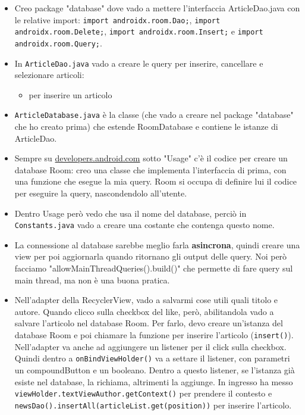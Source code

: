 \begin{itemize}
    \item Creo package "database" dove vado a mettere l'interfaccia ArticleDao.java con le relative import: \texttt{import androidx.room.Dao;}, \texttt{import androidx.room.Delete;}, \texttt{import androidx.room.Insert;} e \texttt{import androidx.room.Query;}.
    \item In \texttt{ArticleDao.java} vado a creare le query per inserire, cancellare e selezionare articoli:
    \begin{itemize}
        \item \texttt{\@Insert} per inserire un articolo
    \end{itemize}
    \item \texttt{ArticleDatabase.java} è la classe (che vado a creare nel package "database" che ho creato prima) che estende RoomDatabase e contiene le istanze di ArticleDao.
    \item Sempre su \url{developers.android.com} sotto "Usage" c'è il codice per creare un database Room: creo una classe che implementa l'interfaccia di prima, con una funzione che esegue la mia query. Room si occupa di definire lui il codice per eseguire la query, nascondendolo all'utente.
    \item Dentro Usage però vedo che usa il nome del database, perciò in \texttt{Constants.java} vado a creare una costante che contenga questo nome.
    \item La connessione al database sarebbe meglio farla \textbf{asincrona}, quindi creare una view per poi aggiornarla quando ritornano gli output delle query. Noi però facciamo "allowMainThreadQueries().build()" che permette di fare query sul main thread, ma non è una buona pratica.
    \item Nell'adapter della RecyclerView, vado a salvarmi cose utili quali titolo e autore. Quando clicco sulla checkbox del like, però, abilitandola vado a salvare l'articolo nel database Room. Per farlo, devo creare un'istanza del database Room e poi chiamare la funzione per inserire l'articolo (\texttt{insert()}). Nell'adapter va anche ad aggiungere un listener per il click sulla checkbox. Quindi dentro a \texttt{onBindViewHolder()} va a settare il listener, con parametri un compoundButton e un booleano. Dentro a questo listener, se l'istanza già esiste nel database, la richiama, altrimenti la aggiunge. In ingresso ha messo \texttt{viewHolder.textViewAuthor.getContext()} per prendere il contesto e \texttt{newsDao().insertAll(articleList.get(position))} per inserire l'articolo.\\

\end{itemize}
